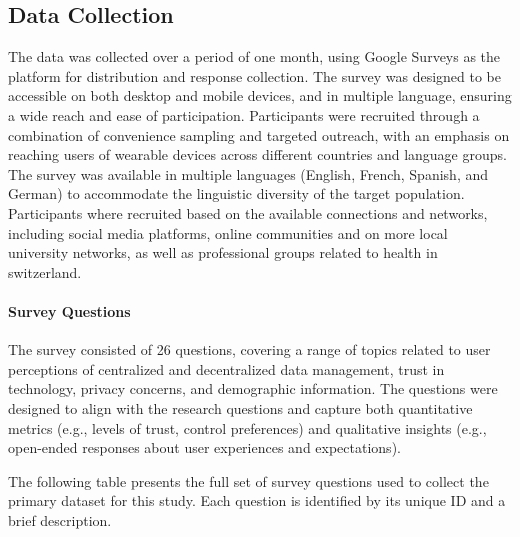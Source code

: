 \subsection{Data Collection}
The data was collected over a period of one month, using Google Surveys as the platform for distribution and response collection. The survey was designed to be accessible on both desktop and mobile devices, and in multiple language, ensuring a wide reach and ease of participation. Participants were recruited through a combination of convenience sampling and targeted outreach, with an emphasis on reaching users of wearable devices across different countries and language groups. The survey was available in multiple languages (English, French, Spanish, and German) to accommodate the linguistic diversity of the target population.
Participants where recruited based on the available connections and networks, including social media platforms, online communities and on more local university networks, as well as professional groups related to health in switzerland.

\paragraph{Survey Questions}
The survey consisted of 26 questions, covering a range of topics related to user perceptions of centralized and decentralized data management, trust in technology, privacy concerns, and demographic information. The questions were designed to align with the research questions and capture both quantitative metrics (e.g., levels of trust, control preferences) and qualitative insights (e.g., open-ended responses about user experiences and expectations).

	The following table presents the full set of survey questions used to collect the primary dataset for this study. Each question is identified by its unique ID and a brief description.


